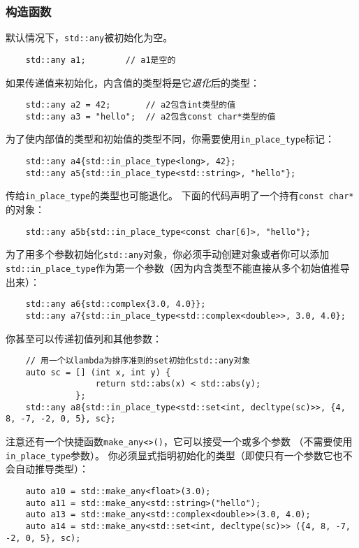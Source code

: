 \subsubsection{构造函数}
默认情况下，\texttt{std::any}被初始化为空。
\begin{lstlisting}
    std::any a1;        // a1是空的
\end{lstlisting}
如果传递值来初始化，内含值的类型将是它\emph{退化}后的类型：
\begin{lstlisting}
    std::any a2 = 42;       // a2包含int类型的值
    std::any a3 = "hello";  // a2包含const char*类型的值
\end{lstlisting}
为了使内部值的类型和初始值的类型不同，你需要使用\texttt{in\_place\_type}标记：
\begin{lstlisting}
    std::any a4{std::in_place_type<long>, 42};
    std::any a5{std::in_place_type<std::string>, "hello"};
\end{lstlisting}
传给\texttt{in\_place\_type}的类型也可能退化。
下面的代码声明了一个持有\texttt{const char*}的对象：
\begin{lstlisting}
    std::any a5b{std::in_place_type<const char[6]>, "hello"};
\end{lstlisting}
为了用多个参数初始化\texttt{std::any}对象，你必须手动创建对象或者你可以添加
\texttt{std::in\_place\_type}作为第一个参数（因为内含类型不能直接从多个初始值推导出来）：
\begin{lstlisting}
    std::any a6{std::complex{3.0, 4.0}};
    std::any a7{std::in_place_type<std::complex<double>>, 3.0, 4.0};
\end{lstlisting}
你甚至可以传递初值列和其他参数：
\begin{lstlisting}
    // 用一个以lambda为排序准则的set初始化std::any对象
    auto sc = [] (int x, int y) {
                  return std::abs(x) < std::abs(y);
              };
    std::any a8{std::in_place_type<std::set<int, decltype(sc)>>, {4, 8, -7, -2, 0, 5}, sc};
\end{lstlisting}
注意还有一个快捷函数\texttt{make\_any<>()}，它可以接受一个或多个参数
（不需要使用\texttt{in\_place\_type}参数）。
你必须显式指明初始化的类型（即使只有一个参数它也不会自动推导类型）：
\begin{lstlisting}
    auto a10 = std::make_any<float>(3.0);
    auto a11 = std::make_any<std::string>("hello");
    auto a13 = std::make_any<std::complex<double>>(3.0, 4.0);
    auto a14 = std::make_any<std::set<int, decltype(sc)>> ({4, 8, -7, -2, 0, 5}, sc);
\end{lstlisting}

